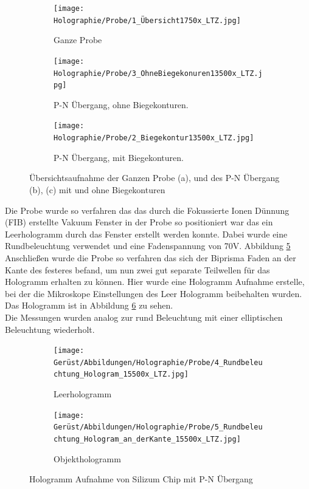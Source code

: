 \begin{figure}
     \centering
     \begin{subfigure}[b]{0.3\textwidth}
         \centering
         \texttt{[image: Holographie/Probe/1\_Übersicht1750x\_LTZ.jpg]}
         \caption{Ganze Probe}
         \label{P-NÜbersicht}
     \end{subfigure}
     \hfill
     \begin{subfigure}[b]{0.3\textwidth}
         \centering
         \texttt{[image: Holographie/Probe/3\_OhneBiegekonuren13500x\_LTZ.jpg]}
         \caption{P-N Übergang, ohne Biegekonturen.}
         \label{P-NOhneKonturen}
     \end{subfigure}
     \hfill
     \begin{subfigure}[b]{0.3\textwidth}
         \centering
         \texttt{[image: Holographie/Probe/2\_Biegekontur13500x\_LTZ.jpg]}
         \caption{P-N Übergang, mit Biegekonturen.}
         \label{P-NMitKonturen}
     \end{subfigure}
        \caption{Übersichtsaufnahme der Ganzen Probe (a), und des P-N Übergang (b), (c) mit und ohne Biegekonturen}
        \label{P-NTEMÜbersicht}
\end{figure}

Die Probe wurde so verfahren das das durch die Fokussierte Ionen Dünnung (FIB) erstellte Vakuum Fenster in der Probe so positioniert war das ein Leerhologramm durch das Fenster erstellt werden konnte. Dabei wurde eine Rundbeleuchtung verwendet und eine Fadenspannung von 70V. Abbildung \cref{P-NLeer}\\
Anschließen wurde die Probe so verfahren das sich der Biprisma Faden an der Kante des festeres befand, um nun zwei gut separate Teilwellen für das Hologramm erhalten zu können. Hier wurde eine Hologramm Aufnahme erstelle, bei der die Mikroskope Einstellungen des Leer Hologramm beibehalten wurden. Das Hologramm ist in Abbildung \cref{P-NObjekt} zu sehen.\\
Die Messungen wurden analog zur rund Beleuchtung mit einer elliptischen Beleuchtung wiederholt.

\begin{figure}[H]
     \centering
     \begin{subfigure}[b]{0.49\textwidth}
         \centering
         \texttt{[image: Gerüst/Abbildungen/Holographie/Probe/4\_Rundbeleuchtung\_Hologram\_15500x\_LTZ.jpg]}
         \caption{Leerhologramm}
         \label{P-NLeer}
     \end{subfigure}
     \hfill
     \begin{subfigure}[b]{0.49\textwidth}
         \centering
         \texttt{[image: Gerüst/Abbildungen/Holographie/Probe/5\_Rundbeleuchtung\_Hologram\_an\_derKante\_15500x\_LTZ.jpg]}
         \caption{Objekthologramm}
         \label{P-NObjekt}
     \end{subfigure}
        \caption{Hologramm Aufnahme von Silizum Chip mit P-N Übergang}
        \label{AmpPhaseBild}
\end{figure}

